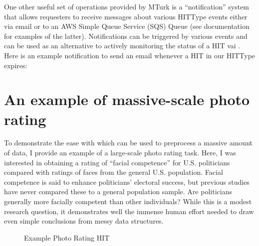 One other useful set of operations provided by MTurk is a ``notification'' system that allows requesters to receive messages about various HITType events either via email or to an AWS Simple Queue Service (SQS) Queue (see  documentation for examples of the latter). Notifications can be triggered by various events and can be used as an alternative to actively monitoring the status of a HIT vai . Here is an example notification to send an email whenever a HIT in our HITType expires:



\section{An example of massive-scale photo rating}

To demonstrate the ease with which  can be used to preprocess a massive amount of data, I provide an example of a large-scale photo rating task. Here, I was interested in obtaining a rating of ``facial competence'' for U.S. politicians compared with ratings of faces from the general U.S. population. Facial competence is said to enhance politicians' electoral success, but previous studies have never compared these to a general population sample. Are politicians generally more facially competent than other individuals? While this is a modest research question, it demonstrates well the immense human effort needed to draw even simple conclusions from messy data structures.

\begin{figure}
\begin{center}
\end{center}
\caption{Example Photo Rating HIT}\label{fig:hit2}
\end{figure}


